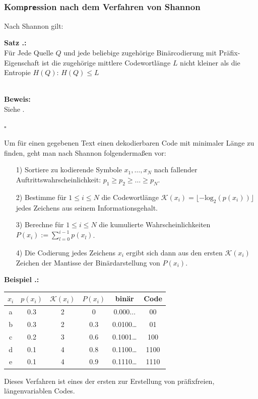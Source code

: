 \documentclass[a4paper,12pt]{article}
\newcounter{Beispiel}
\newcounter{Satz}
\newenvironment{Satz}{
\medskip
        
        \setlength{\parindent}{0pt}
        \addtocounter{Satz}{1}
        \textbf{\textsf{Satz \thesubsection.\theSatz}:}\\}{
        \nopagebreak
        \vspace{-1.0ex}
        \bigskip\\
        
}
\newenvironment{Beispiel}{
\medskip
        
        \setlength{\parindent}{0pt}
        \addtocounter{Beispiel}{1}
        \textbf{\textsf{Beispiel \thesubsection.\theBeispiel}:}\\}{
        \nopagebreak
        \vspace{-1.0ex}
        \bigskip
        
}
\newenvironment{proof}{
        \setlength{\parindent}{0pt}
        \textbf{Beweis:}\\}{
        \nopagebreak
        \vspace{-1.0ex}
        \begin{flushright}
             $\square$
        \end{flushright}
        \bigskip
        
}
\begin{document}
\subsubsection{Kom{\tt{pre}}ssion nach dem Verfahren von Shannon}
Nach Shannon gilt:
\begin{Satz}
Für Jede Quelle $Q$ und jede beliebige zugehörige Binärcodierung mit 
Präfix-Eigenschaft ist die zugehörige mittlere Codewortlänge $L$ 
nicht kleiner als die Entropie $H(Q)$: $H(Q)\leq L$
\end{Satz}
\begin{proof}
Siehe \cite{Rohling}.
\end{proof}
Um für einen gegebenen Text einen dekodierbaren Code mit minimaler Länge zu finden, geht man nach Shannon folgendermaßen vor:
\begin{itemize}
	\item[1)]  Sortiere zu kodierende Symbole $x_{1},\ldots,x_{N}$ nach fallender Auftrittswahrscheinlichkeit: 
$p_{1}\geq p_{2}\geq\ldots\geq p_{N}$.
	\item[2)] Bestimme für $1\leq i \leq N$ die Codewortlänge $\mathcal{K}(x_{i}) = \lfloor -\text{log}_2(p(x_{i}))\rfloor$ jedes Zeichens aus seinem Informationsgehalt.
	\item[3)] Berechne für $1\leq i \leq N$ die kumulierte Wahrscheinlichkeiten $P(x_{i}):=\sum_{l=0}^{i-1}p(x_{l})$.
	\item[4)] Die Codierung jedes Zeichens $x_{i}$ ergibt sich dann aus den ersten $\mathcal{K}(x_{i})$ Zeichen der Mantisse der Binärdarstellung von $P(x_{i})$.
\end{itemize}
\begin{Beispiel}

\begin{center}
\begin{tabular}{c|c|c|c|c|c}
$x_{i}$ & $p(x_{i})$ & $\mathcal{K}(x_{i})$ & $P(x_{i})$ & binär & Code
\\
\hline
a & 0.3 & 2 & 0 & $0.000\ldots$ & 00
\\
\hline
b & 0.3  & 2 & 0.3 & 0.0100\ldots & 01
\\
\hline
c & 0.2  & 3 & 0.6 & 0.1001\ldots & 100
\\
\hline
d & 0.1  & 4 & 0.8 & 0.1100\ldots & 1100
\\
\hline
e & 0.1  & 4 & 0.9 & 0.1110\ldots & 1110
\end{tabular}
\end{center}
\end{Beispiel}
Dieses Verfahren ist eines der ersten zur Erstellung von präfixfreien, längenvariablen Codes.
\end{document}

